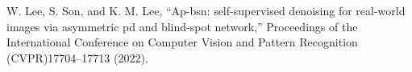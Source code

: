 W. Lee, S. Son, and K. M. Lee, “Ap-bsn: self-supervised denoising for real-world images via asymmetric pd and blind-spot network,” Proceedings of the International Conference on Computer Vision and Pattern Recognition (CVPR)17704–17713 (2022).

